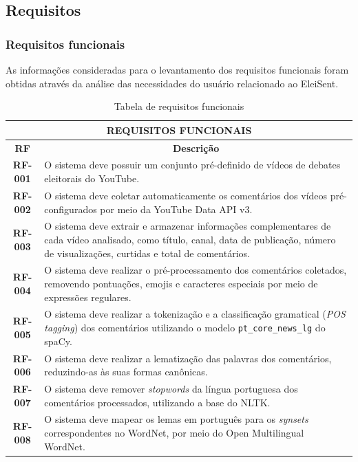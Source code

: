 \documentclass[
	12pt,				%
	openright,			%
	oneside,			%
	a4paper,			%
	english,			%
	brazil				%
	]{abntex2}
\begin{document}
\subsection{Requisitos}

\subsubsection{Requisitos funcionais}

As informações consideradas para o levantamento dos requisitos funcionais foram obtidas através da análise das necessidades do usuário relacionado ao EleiSent.

\begin{table}[!htbp]
\centering
\caption{Tabela de requisitos funcionais}
\label{tab:req_funcionais}
\scriptsize
\setlength{\tabcolsep}{4pt}
\renewcommand{\arraystretch}{1.15}
\begin{tabular}{|c|p{11cm}|}
\hline
\multicolumn{2}{|c|}{\textbf{REQUISITOS FUNCIONAIS}} \\ \hline
\textbf{RF} & \multicolumn{1}{c|}{\textbf{Descrição}} \\ \hline
\textbf{RF-001} & O sistema deve possuir um conjunto pré-definido de vídeos de debates eleitorais do YouTube.\\ \hline
\textbf{RF-002} & O sistema deve coletar automaticamente os comentários dos vídeos pré-configurados por meio da YouTube Data API v3. \\ \hline
\textbf{RF-003} & O sistema deve extrair e armazenar informações complementares de cada vídeo analisado, como título, canal, data de publicação, número de visualizações, curtidas e total de comentários. \\ \hline
\textbf{RF-004} & O sistema deve realizar o pré-processamento dos comentários coletados, removendo pontuações, emojis e caracteres especiais por meio de expressões regulares. \\ \hline
\textbf{RF-005} & O sistema deve realizar a tokenização e a classificação gramatical (\textit{POS tagging}) dos comentários utilizando o modelo \texttt{pt\_core\_news\_lg} do spaCy. \\ \hline
\textbf{RF-006} & O sistema deve realizar a lematização das palavras dos comentários, reduzindo-as às suas formas canônicas. \\ \hline
\textbf{RF-007} & O sistema deve remover \textit{stopwords} da língua portuguesa dos comentários processados, utilizando a base do NLTK. \\ \hline
\textbf{RF-008} & O sistema deve mapear os lemas em português para os \textit{synsets} correspondentes no WordNet, por meio do Open Multilingual WordNet. \\ \hline

\end{tabular}
\end{table}
\end{document}
